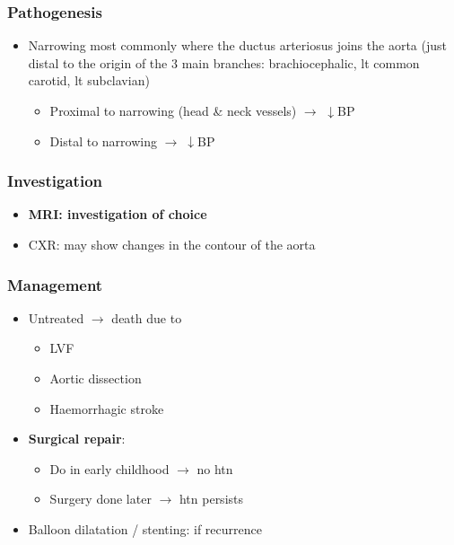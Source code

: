 \documentclass[
  12pt,
]{memoir}
\providecommand{\tightlist}{%
  \setlength{\itemsep}{0pt}\setlength{\parskip}{0pt}}
\begin{document}
\hypertarget{pathogenesis-4}{%
\subsubsection{Pathogenesis}\label{pathogenesis-4}}

\begin{itemize}
\tightlist
\item
  Narrowing most commonly where the ductus arteriosus joins the aorta
  (just distal to the origin of the 3 main branches: brachiocephalic, lt
  common carotid, lt subclavian)

  \begin{itemize}
  \tightlist
  \item
    Proximal to narrowing (head \& neck vessels) \(\rightarrow\)
    \(\downarrow\)BP
  \item
    Distal to narrowing \(\rightarrow\;\downarrow\)BP
  \end{itemize}
\end{itemize}

\hypertarget{investigation-7}{%
\subsubsection{Investigation}\label{investigation-7}}

\begin{itemize}
\tightlist
\item
  \textbf{MRI: investigation of choice}
\item
  CXR: may show changes in the contour of the aorta
\end{itemize}

\hypertarget{management-9}{%
\subsubsection{Management}\label{management-9}}

\begin{itemize}
\tightlist
\item
  Untreated \(\rightarrow\) death due to

  \begin{itemize}
  \tightlist
  \item
    LVF
  \item
    Aortic dissection
  \item
    Haemorrhagic stroke
  \end{itemize}
\item
  \textbf{Surgical repair}:

  \begin{itemize}
  \tightlist
  \item
    Do in early childhood \(\rightarrow\) no htn
  \item
    Surgery done later \(\rightarrow\) htn persists
  \end{itemize}
\item
  Balloon dilatation / stenting: if recurrence
\end{itemize}
\end{document}

